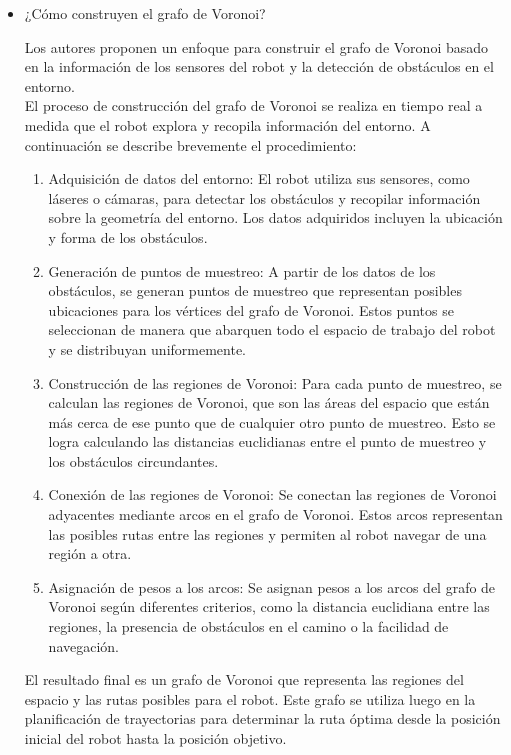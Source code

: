 \documentclass{article}
\begin{document}
\begin{itemize}
\item ¿Cómo construyen el grafo de Voronoi?

  Los autores proponen un enfoque para construir el grafo de Voronoi basado en la información de los sensores del robot y la detección de obstáculos en el entorno.\\

  El proceso de construcción del grafo de Voronoi se realiza en tiempo real a medida que el robot explora y recopila información del entorno. A continuación se describe brevemente el procedimiento:\\

  \begin{enumerate}
  \item Adquisición de datos del entorno: El robot utiliza sus sensores, como láseres o cámaras, para detectar los obstáculos y recopilar información sobre la geometría del entorno. Los datos adquiridos incluyen la ubicación y forma de los obstáculos.
  \item Generación de puntos de muestreo: A partir de los datos de los obstáculos, se generan puntos de muestreo que representan posibles ubicaciones para los vértices del grafo de Voronoi. Estos puntos se seleccionan de manera que abarquen todo el espacio de trabajo del robot y se distribuyan uniformemente.
  \item Construcción de las regiones de Voronoi: Para cada punto de muestreo, se calculan las regiones de Voronoi, que son las áreas del espacio que están más cerca de ese punto que de cualquier otro punto de muestreo. Esto se logra calculando las distancias euclidianas entre el punto de muestreo y los obstáculos circundantes.
  \item Conexión de las regiones de Voronoi: Se conectan las regiones de Voronoi adyacentes mediante arcos en el grafo de Voronoi. Estos arcos representan las posibles rutas entre las regiones y permiten al robot navegar de una región a otra.
  \item Asignación de pesos a los arcos: Se asignan pesos a los arcos del grafo de Voronoi según diferentes criterios, como la distancia euclidiana entre las regiones, la presencia de obstáculos en el camino o la facilidad de navegación.
  \end{enumerate}

  El resultado final es un grafo de Voronoi que representa las regiones del espacio y las rutas posibles para el robot. Este grafo se utiliza luego en la planificación de trayectorias para determinar la ruta óptima desde la posición inicial del robot hasta la posición objetivo.
  

\end{itemize}
\end{document}
